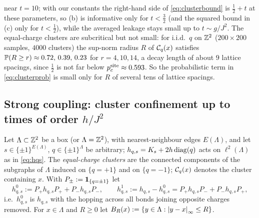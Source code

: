 \begin{remark}
\begin{itemize}
near $t=10$; with our constants the right-hand side of \eqref{eq:clusterbound} is $\frac12+t$ at these parameters, so
(b) is informative only for $t<\frac32$ (and the squared bound in (c) only for $t<\frac12$), while the averaged
leakage stays small up to $t\sim g/J^2$.  The equal-charge clusters are subcritical but not small:
for i.i.d.\ $q$ on $\mathbb{Z}^2$ ($200\times200$ samples, $4000$ clusters) the sup-norm radius $R$ of $\mathcal{C}_q(x)$ satisfies
$\mathbb{P}(R\ge r)\approx0.72,\,0.39,\,0.23$ for $r=4,10,14$, a decay length of about $9$ lattice spacings, since
$\frac12$ is not far below $p_c^{\rm site}\approx0.593$.  So the probabilistic term in \eqref{eq:clusterprob} is small
only for $R$ of several tens of lattice spacings.
\end{itemize}
\end{remark}

\subsection{Strong coupling: cluster confinement up to times of order \texorpdfstring{$h/J^2$}{h/J²}}\label{sec:2d:strong}

Let $\Lambda\subset\mathbb{Z}^2$ be a box (or $\Lambda=\mathbb{Z}^2$), with nearest-neighbour edges $E(\Lambda)$, and let
$s\in\{\pm1\}^{E(\Lambda)}$, $q\in\{\pm1\}^\Lambda$ be arbitrary; $h_{q,s}=K_s+2h\operatorname{diag}(q)$ acts on $\ell^2(\Lambda)$ as
in \eqref{eq:hqs}.  The \emph{equal-charge clusters} are the connected components of the subgraphs of $\Lambda$
induced on $\{q=+1\}$ and on $\{q=-1\}$; $\mathcal{C}_q(x)$ denotes the cluster containing $x$.  With
$P_\pm:=\mathbf{1}_{\{q=\pm1\}}$ let
\begin{equation}\label{eq:h0}
  h^0_{q,s}:=P_+h_{q,s}P_++P_-h_{q,s}P_-,\qquad h^1_{q,s}:=h_{q,s}-h^0_{q,s}=P_+h_{q,s}P_-+P_-h_{q,s}P_+ ,
\end{equation}
i.e.\ $h^0_{q,s}$ is $h_{q,s}$ with the hopping across all bonds joining opposite charges removed.  For
$x\in\Lambda$ and $R\ge0$ let $B_R(x):=\{y\in\Lambda:\left|y-x\right|_\infty\le R\}$.

